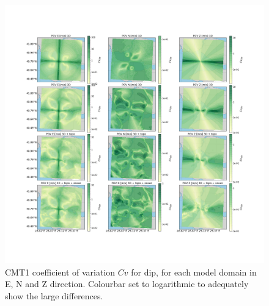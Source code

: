 \documentclass[../Text/00main.tex]{subfiles}
\begin{document}
\begin{figure}[htb]
    \centering
    \includegraphics[width=1\linewidth,trim = 2cm 5cm 1cm 5cm, clip]{images_results/dip_variation_sigma_sc1.png}
    \caption{CMT1 coefficient of variation $Cv$ for dip, for each model domain in E, N and Z direction. Colourbar set to logarithmic to adequately show the large differences.}
    \label{fig:ref_sigma1_dip}
\end{figure}
\end{document}

